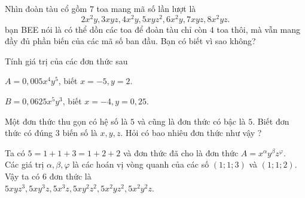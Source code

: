 \begin{vd}%
	Nhìn đoàn tàu cổ gồm $7$ toa mang mã số lần lượt là $$2x^2y,3xyz,4x^2y,5xyz^2,6x^2y,7xyz,8x^2yz.$$
	bạn BEE nói là có thể dồn các toa để đoàn tàu chỉ còn $4$ toa thôi, mà vẫn mang đầy đủ phần biến của các mã số ban đầu. Bạn có biết vì sao không?
\end{vd}

\begin{vd}%
	Tính giá trị của các đơn thức sau
	\begin{enumEX}{1}
		\item $A=0{,}005x^4y^5$, biết $x=-5,y=2$.
		\item $B=0{,}0625x^5y^3$, biết $x=-4,y=0{,}25$.
	\end{enumEX}
\end{vd}


\begin{vd}%
	Một đơn thức thu gọn có hệ số là $ 5 $ và cũng là đơn thức có bậc là $ 5 $. Biết đơn thức có đúng $ 3 $ biến số là $ x,y,z $. Hỏi có bao nhiêu đơn thức như vậy ?
	\loigiai
	{
		Ta có $ 5=1+1+3=1+2+2 $ và đơn thức đã cho là đơn thức $ A=x^\alpha y^\beta z^\varphi $.\\
		Các giá trị $ \alpha, \beta , \varphi $ là các hoán vị vòng quanh của các số $ (1;1;3) $ và $ (1;1;2) $.\\
		Vậy ta có $ 6 $ đơn thức là\\
		$5xyz^3, 5xy^3z, 5x^3z, 5xy^2z^2, 5x^2yz^2, 5x^2y^2z$.
		
	}
\end{vd}

